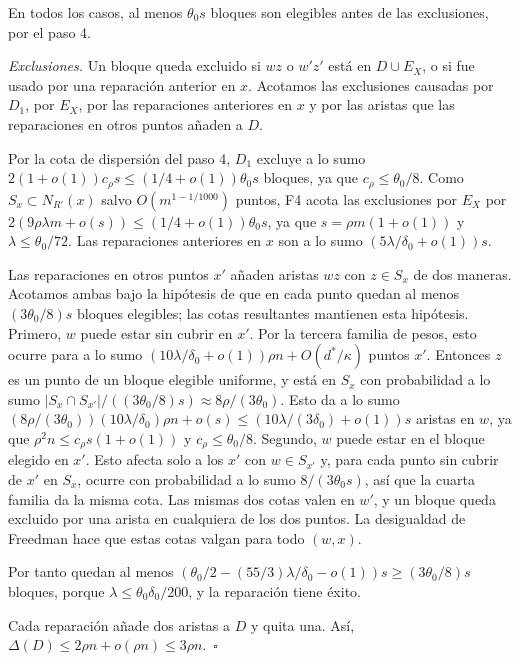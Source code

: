 \documentclass[spanish,11pt,a4paper]{article}
\begin{document}
En todos los casos, al menos \(\theta_0s\) bloques son elegibles antes de las exclusiones, por el paso 4.

\emph{Exclusiones.} Un bloque queda excluido si \(wz\) o \(w'z'\) está en \(D\cup E_X\), o si fue usado por una reparación anterior en \(x\). Acotamos las exclusiones causadas por \(D_1\), por \(E_X\), por las reparaciones anteriores en \(x\) y por las aristas que las reparaciones en otros puntos añaden a \(D\).

Por la cota de dispersión del paso 4, \(D_1\) excluye a lo sumo \(2(1+o(1))c_\rho s\le(1/4+o(1))\theta_0s\) bloques, ya que \(c_\rho\le\theta_0/8\). Como \(S_x\subset N_{R'}(x)\) salvo \(O(m^{1-1/1000})\) puntos, F4 acota las exclusiones por \(E_X\) por \(2(9\rho\lambda m+o(s))\le(1/4+o(1))\theta_0s\), ya que \(s=\rho m(1+o(1))\) y \(\lambda\le\theta_0/72\). Las reparaciones anteriores en \(x\) son a lo sumo \((5\lambda/\delta_0+o(1))s\).

Las reparaciones en otros puntos \(x'\) añaden aristas \(wz\) con \(z\in S_x\) de dos maneras. Acotamos ambas bajo la hipótesis de que en cada punto quedan al menos \((3\theta_0/8)s\) bloques elegibles; las cotas resultantes mantienen esta hipótesis. Primero, \(w\) puede estar sin cubrir en \(x'\). Por la tercera familia de pesos, esto ocurre para a lo sumo \((10\lambda/\delta_0+o(1))\rho n+O(d^*/\kappa)\) puntos \(x'\). Entonces \(z\) es un punto de un bloque elegible uniforme, y está en \(S_x\) con probabilidad a lo sumo \(|S_x\cap S_{x'}|/((3\theta_0/8)s)\approx8\rho/(3\theta_0)\). Esto da a lo sumo \((8\rho/(3\theta_0))(10\lambda/\delta_0)\rho n+o(s)\le(10\lambda/(3\delta_0)+o(1))s\) aristas en \(w\), ya que \(\rho^2n\le c_\rho s(1+o(1))\) y \(c_\rho\le\theta_0/8\). Segundo, \(w\) puede estar en el bloque elegido en \(x'\). Esto afecta solo a los \(x'\) con \(w\in S_{x'}\) y, para cada punto sin cubrir de \(x'\) en \(S_x\), ocurre con probabilidad a lo sumo \(8/(3\theta_0s)\), así que la cuarta familia da la misma cota. Las mismas dos cotas valen en \(w'\), y un bloque queda excluido por una arista en cualquiera de los dos puntos. La desigualdad de Freedman hace que estas cotas valgan para todo \((w,x)\).

Por tanto quedan al menos \((\theta_0/2-(55/3)\lambda/\delta_0-o(1))s\ge(3\theta_0/8)s\) bloques, porque \(\lambda\le\theta_0\delta_0/200\), y la reparación tiene éxito.

Cada reparación añade dos aristas a \(D\) y quita una. Así, \(\Delta(D)\le2\rho n+o(\rho n)\le3\rho n\).~\(\square\)
\end{document}
